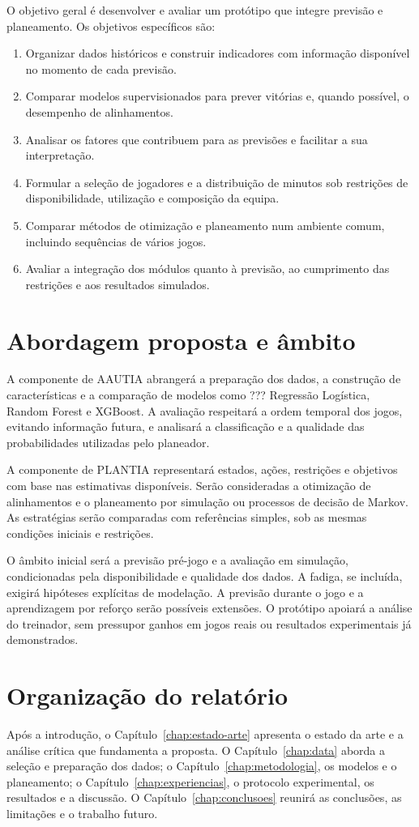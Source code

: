 O objetivo geral é desenvolver e avaliar um protótipo que integre previsão
e planeamento. Os objetivos específicos são:

\begin{enumerate}
  \item Organizar dados históricos e construir indicadores com informação
  disponível no momento de cada previsão.
  \item Comparar modelos supervisionados para prever vitórias e, quando
  possível, o desempenho de alinhamentos.
  \item Analisar os fatores que contribuem para as previsões e facilitar
  a sua interpretação.
  \item Formular a seleção de jogadores e a distribuição de minutos sob
  restrições de disponibilidade, utilização e composição da equipa.
  \item Comparar métodos de otimização e planeamento num ambiente comum,
  incluindo sequências de vários jogos.
  \item Avaliar a integração dos módulos quanto à previsão, ao cumprimento
  das restrições e aos resultados simulados.
\end{enumerate}

\section{Abordagem proposta e âmbito}

A componente de AAUTIA abrangerá a preparação dos dados, a construção de
características e a comparação de modelos como ??? Regressão Logística,
Random Forest e XGBoost. A avaliação respeitará a ordem temporal dos jogos,
evitando informação futura, e analisará a classificação e a qualidade das
probabilidades utilizadas pelo planeador.

A componente de PLANTIA representará estados, ações, restrições e objetivos
com base nas estimativas disponíveis. Serão consideradas a otimização de
alinhamentos e o planeamento por simulação ou processos de decisão de
Markov. As estratégias serão comparadas com referências simples, sob as
mesmas condições iniciais e restrições.

O âmbito inicial será a previsão pré-jogo e a avaliação em simulação,
condicionadas pela disponibilidade e qualidade dos dados. A fadiga, se
incluída, exigirá hipóteses explícitas de modelação. A previsão durante o
jogo e a aprendizagem por reforço serão possíveis extensões. O protótipo
apoiará a análise do treinador, sem pressupor ganhos em jogos reais ou
resultados experimentais já demonstrados.

\section{Organização do relatório}

Após a introdução, o Capítulo~\ref{chap:estado-arte} apresenta o estado da
arte e a análise crítica que fundamenta a proposta.
O Capítulo~\ref{chap:data} aborda a seleção e preparação dos dados;
o Capítulo~\ref{chap:metodologia}, os modelos e o planeamento; o Capítulo~\ref{chap:experiencias}, o protocolo
experimental, os resultados e a discussão.
O Capítulo~\ref{chap:conclusoes} reunirá as conclusões, as limitações e o
trabalho futuro.
